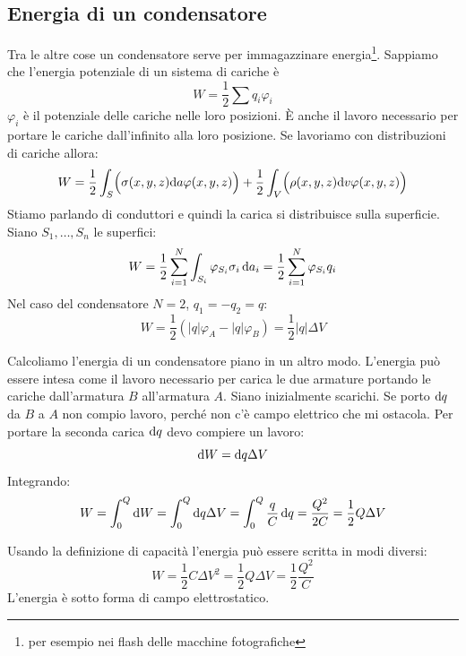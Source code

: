 \subsection{Energia di un condensatore}
Tra le altre cose un condensatore serve per immagazzinare energia\footnote{per esempio nei flash delle macchine fotografiche}. Sappiamo che l'energia potenziale di un sistema di cariche è
\[W=\frac{1}{2}\sum q_i\varphi_i\]
$\varphi_i$ è il potenziale delle cariche nelle loro posizioni. \`E anche il lavoro necessario per portare le cariche dall'infinito alla loro posizione. Se lavoriamo con distribuzioni di cariche allora:
\[W=\frac{1}{2}\int_S\Bigl(\sigma(x,y,z)\mathrm{d} a\varphi(x,y,z)\Bigr)+\frac{1}{2}\int_V\Bigl(\rho(x,y,z)\mathrm{d} v\varphi(x,y,z)\Bigr)\]
Stiamo parlando di conduttori e quindi la carica si distribuisce sulla superficie. Siano $S_1,\ldots,S_n$ le superfici:
\[W=\frac{1}{2}\sum_{i=1}^N\int_{S_i}\varphi_{S_i}\sigma_i\,\mathrm{d} a_i=\frac{1}{2}\sum_{i=1}^N\varphi_{S_i}q_{i}\]
Nel caso del condensatore $N=2$, $q_1=-q_2=q$:
\[W=\frac{1}{2}\left(|q|\varphi_A-|q|\varphi_B\right)=\frac{1}{2}|q|\Delta V\]

\begin{Es}
  Calcoliamo l'energia di un condensatore piano in un altro modo. L'energia può essere intesa come il lavoro necessario per carica le due armature portando le cariche dall'armatura $B$ all'armatura $A$. Siano inizialmente scarichi. Se porto $\mathrm{d} q$ da $B$ a $A$ non compio lavoro, perché non c'è campo elettrico che mi ostacola. Per portare la seconda carica $\mathrm{d} q$ devo compiere un lavoro:
  \[\mathrm{d} W=\mathrm{d} q\Delta V\]
  Integrando:
  \[W=\int_0^Q\mathrm{d} W=\int_0^Q\mathrm{d} q\Delta V=\int_0^Q\frac{q}{C}\,\mathrm{d} q=\frac{Q^2}{2C}=\frac{1}{2}Q\Delta V\]
\end{Es}

Usando la definizione di capacità l'energia può essere scritta in modi diversi:
\begin{equation}
  W=\frac{1}{2}C\Delta V^2=\frac{1}{2}Q\Delta V=\frac{1}{2}\frac{Q^2}{C}
\end{equation}
L'energia è sotto forma di campo elettrostatico.


